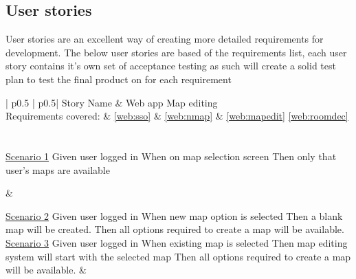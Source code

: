 \subsection{User stories}
User stories are an excellent way of creating more detailed requirements for development. The below user stories are based of the requirements list, each user story contains it's own set of acceptance testing as such will create a solid test plan to test the final product on for each requirement\\

\begin{longtable}{| p{} | p{}|}
	\hline
	\newline Story Name & \newline Web app Map editing\\\hline
	\newline Requirements covered: & \newline \ref{web:sso} \& \ref{web:nmap} \& \ref{web:mapedit} \ref{web:roomdec} \\\hline
	\\\hline
	\\\hline
	\newline\underline{Scenario 1}\newline
	Given user logged in \newline
	When on map selection screen \newline 
	Then only that user's maps are available\newline
	
	&
	
	\newline\underline{Scenario 2}\newline
	Given user logged in \newline
	When new map option is selected \newline 
	Then a blank map will be created.\newline
	Then all options required to create a map will be available.\newline
	\\\hline
	\newline\underline{Scenario 3}\newline
	Given user logged in \newline
	When existing map is selected \newline 
	Then map editing system will start with the selected map\newline
	Then all options required to create a map will be available.\newline
	&
	\\\hline
\end{longtable}

